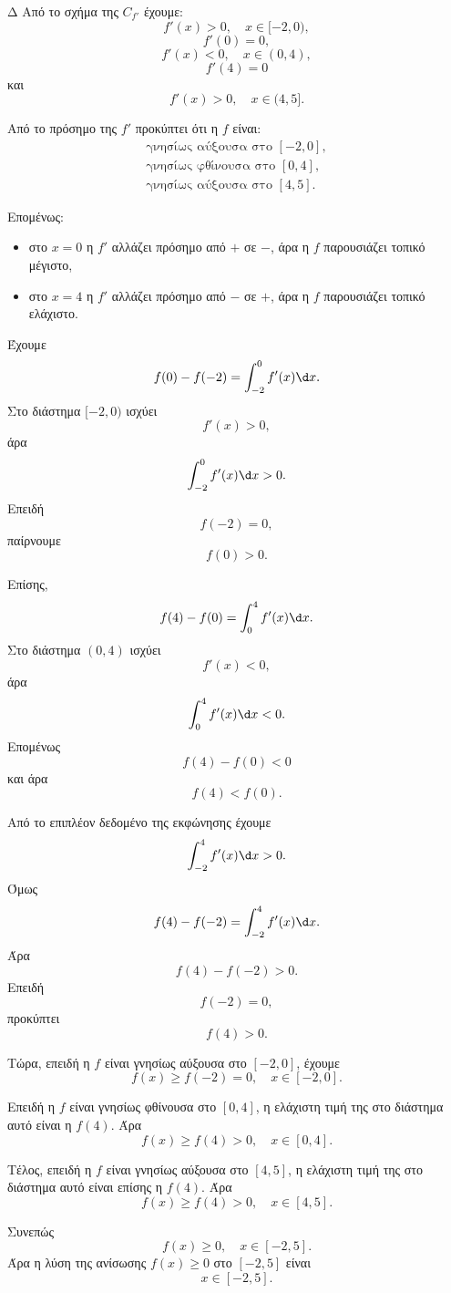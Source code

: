 \begin{thema}{Δ}
Από το σχήμα της $C_{f'}$ έχουμε:
\[
f'(x)>0,\quad x\in[-2,0),
\]
\[
f'(0)=0,
\]
\[
f'(x)<0,\quad x\in(0,4),
\]
\[
f'(4)=0
\]
και
\[
f'(x)>0,\quad x\in(4,5].
\]

\begin{erwthma}
\item Από το πρόσημο της $f'$ προκύπτει ότι η $f$ είναι:
\[
\begin{array}{c}
\text{γνησίως αύξουσα στο }[-2,0],\\
\text{γνησίως φθίνουσα στο }[0,4],\\
\text{γνησίως αύξουσα στο }[4,5].
\end{array}
\]

Επομένως:
\begin{itemize}
\item στο $x=0$ η $f'$ αλλάζει πρόσημο από $+$ σε $-$, άρα η $f$
παρουσιάζει τοπικό μέγιστο,
\item στο $x=4$ η $f'$ αλλάζει πρόσημο από $-$ σε $+$, άρα η $f$
παρουσιάζει τοπικό ελάχιστο.
\end{itemize}

\item Έχουμε
\[
f(0)-f(-2)=\int_{-2}^{0}f'(x)\d x.
\]
Στο διάστημα $[-2,0)$ ισχύει
\[
f'(x)>0,
\]
άρα
\[
\int_{-2}^{0}f'(x)\d x>0.
\]
Επειδή
\[
f(-2)=0,
\]
παίρνουμε
\[
f(0)>0.
\]

Επίσης,
\[
f(4)-f(0)=\int_0^4 f'(x)\d x.
\]
Στο διάστημα $(0,4)$ ισχύει
\[
f'(x)<0,
\]
άρα
\[
\int_0^4 f'(x)\d x<0.
\]
Επομένως
\[
f(4)-f(0)<0
\]
και άρα
\[
{f(4)<f(0)}.
\]

\item Από το επιπλέον δεδομένο της εκφώνησης έχουμε
\[
\int_{-2}^{4}f'(x)\d x>0.
\]
Όμως
\[
f(4)-f(-2)=\int_{-2}^{4}f'(x)\d x.
\]
Άρα
\[
f(4)-f(-2)>0.
\]
Επειδή
\[
f(-2)=0,
\]
προκύπτει
\[
f(4)>0.
\]

Τώρα, επειδή η $f$ είναι γνησίως αύξουσα στο $[-2,0]$, έχουμε
\[
f(x)\geq f(-2)=0,\quad x\in[-2,0].
\]

Επειδή η $f$ είναι γνησίως φθίνουσα στο $[0,4]$, η ελάχιστη τιμή της
στο διάστημα αυτό είναι η $f(4)$. Άρα
\[
f(x)\geq f(4)>0,\quad x\in[0,4].
\]

Τέλος, επειδή η $f$ είναι γνησίως αύξουσα στο $[4,5]$, η ελάχιστη τιμή
της στο διάστημα αυτό είναι επίσης η $f(4)$. Άρα
\[
f(x)\geq f(4)>0,\quad x\in[4,5].
\]

Συνεπώς
\[
f(x)\geq 0,\quad x\in[-2,5].
\]
Άρα η λύση της ανίσωσης $f(x)\geq 0$ στο $[-2,5]$ είναι
\[
{x\in[-2,5]}.
\]


\end{erwthma}
\end{thema}
